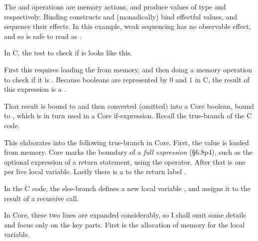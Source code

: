 The  and  operations are %
memory actions, and produce values of type  and
 respectively. Binding constructs 
and  (monadically) bind effectful values, and sequence
their effects. In this example, weak sequencing has no observable effect, and
so is safe to read as .



In C, the test to check if  is  looks like this.


First this requires loading the  from memory, and then doing a
 memory operation to check if it is .
Because booleans are represented by 0 and 1 in C, the result of this expression
is a .


That result is bound to  and then converted (omitted) into a
Core boolean, bound to , which is in turn used in a Core
if-expression. Recall the true-branch of the C code.


This elaborates into the following true-branch in Core. First, the value
 is loaded from memory. Core marks the boundary of a \emph{full
expression} (§6.8p4), such as the optional expression of a return statement,
using the  operator. After that is one %
 per live local variable. Lastly there is a %
 to the return label . %


In the C code, the else-branch defines a new local variable ,
and assigns it to the result of a recursive call.


In Core, these two lines are expanded considerably, so I shall omit some
details and focus only on the key parts. First is the allocation of memory for
the local variable.

